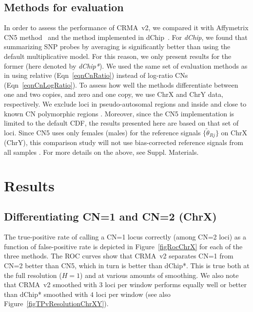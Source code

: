 \documentclass{bioinfo}
\newcommand{\TPrate}{true-positive rate\xspace}
\newcommand{\FPrate}{false-positive rate\xspace}
\begin{document}
\subsection{Methods for evaluation}
\label{secEvaluation}
In order to assess the performance of CRMA~v2, we compared it with Affymetrix CN5 method~\citep{Affymetrix_2008m} and the method implemented in dChip~\citep{LiWong_2001}.  For \emph{dChip}, we found that summarizing SNP probes by averaging is significantly better than using the default multiplicative model.  For this reason, we only present results for the former (here denoted by \emph{dChip*}).  
We used the same set of evaluation methods as in \citet{BengtssonH_etal_2008a} using relative (Eqn~\eqref{eqnCnRatio}) instead of log-ratio CNs (Eqn~\eqref{eqnCnLogRatio}).
To assess how well the methods differentiate between one and two copies, and zero and one copy, we use ChrX and ChrY data, respectively.  We exclude loci in pseudo-autosomal regions and inside and close to known CN polymorphic regions \citep{RedonR_etal_2006}.  Moreover, since the CN5 implementation is limited to the default CDF, the results presented here are based on that set of loci.  
Since CN5 uses only females (males) for the reference signals $\{\tilde\theta_{Rj}\}$ on ChrX (ChrY), this comparison study will not use bias-corrected reference signals from all samples \citep{BengtssonH_etal_2008a}.
For more details on the above, see Suppl. Materials.


 
\section{Results}
\label{secResults}

\subsection{Differentiating CN=1 and CN=2 (ChrX)}
The \TPrate of calling a CN=1 locus correctly (among CN=2 loci) as a function of \FPrate is depicted in Figure~\ref{figRocChrX} for each of the three methods.
The ROC curves show that CRMA~v2 separates CN=1 from CN=2 better than CN5, which in turn is better than dChip*.  This is true both at the full resolution ($H=1$) and at various amounts of smoothing.  
We also note that CRMA~v2 smoothed with $3$ loci per window performs equally well or better than dChip* smoothed with $4$ loci per window (see also Figure~\ref{figTPvResolutionChrXY}).
\end{document}
